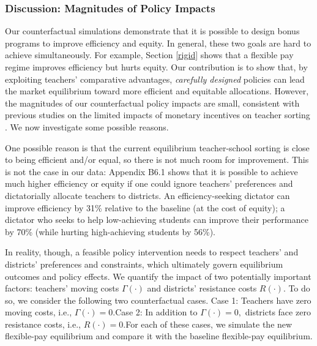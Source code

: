 \documentclass[notitlepage,12pt]{article}%
\begin{document}
\subsubsection{Discussion: Magnitudes of Policy Impacts\label{mag}}

Our counterfactual simulations demonstrate that it is possible to design bonus
programs to improve efficiency and equity. In general, these two goals are
hard to achieve simultaneously. For example, Section \ref{rigid} shows that a
flexible pay regime improves efficiency but hurts equity. Our contribution is
to show that, by exploiting teachers' comparative advantages, \emph{carefully
designed} policies can lead the market equilibrium toward more efficient and
equitable allocations. However, the magnitudes of our counterfactual policy
impacts are small, consistent with previous studies on the limited impacts of
monetary incentives on teacher sorting
\citep[e.g.,][]{clotfelter2011teacher,russell2020ects}. We now investigate
some possible reasons.

One possible reason is that the current equilibrium teacher-school sorting is
close to being efficient and/or equal, so there is not much room for
improvement. This is not the case in our data: Appendix B6.1 shows that
it is possible to achieve much higher efficiency or equity if one could ignore
teachers' preferences and dictatorially allocate teachers to districts. An
efficiency-seeking dictator can improve efficiency by 31\% relative to the
baseline (at the cost of equity); a dictator who seeks to help low-achieving
students can improve their performance by 70\% (while hurting high-achieving
students by 56\%).

In reality, though, a feasible policy intervention needs to respect teachers'
and districts' preferences and constraints, which ultimately govern
equilibrium outcomes and policy effects. We quantify the impact of two
potentially important factors: teachers' moving costs $\Gamma\left(
\cdot\right)  $ and districts' resistance costs $R\left(  \cdot\right)  $. To
do so, we consider the following two counterfactual cases. \newline Case 1:
Teachers have zero moving costs, i.e., $\Gamma\left(  \cdot\right)
=0$.\newline Case 2: In addition to $\Gamma\left(  \cdot\right)  =0,$
districts face zero resistance costs, i.e., $R\left(  \cdot\right)
=0$.\newline For each of these cases, we simulate the new flexible-pay
equilibrium and compare it with the baseline flexible-pay equilibrium.
\end{document}
